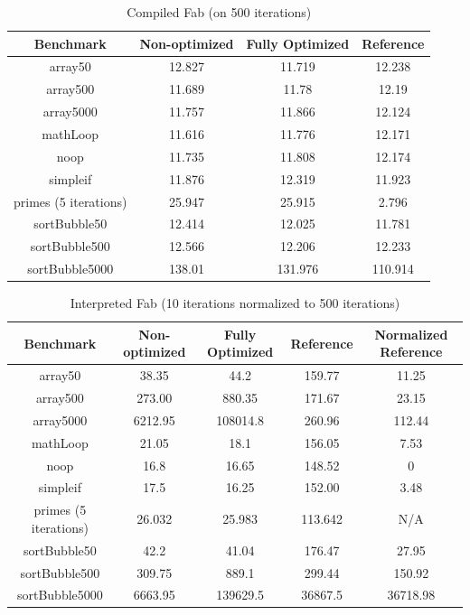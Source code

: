 \documentclass[11pt]{article} %
\begin{document}
\begin{table}[h!]
\centering
\caption{Compiled Fab (on 500 iterations)}
\begin{tabular}{c | c | c | c }
Benchmark & Non-optimized & Fully Optimized & Reference\\ \hline
array50 & 12.827 & 11.719 & 12.238\\ \hline
array500 & 11.689 & 11.78 & 12.19\\ \hline
array5000 & 11.757 & 11.866 & 12.124\\ \hline
mathLoop & 11.616 & 11.776 & 12.171\\ \hline
noop & 11.735 & 11.808 & 12.174\\ \hline
simpleif & 11.876 & 12.319 & 11.923\\ \hline
primes (5 iterations) & 25.947 & 25.915 & 2.796\\ \hline
sortBubble50 & 12.414 & 12.025 & 11.781\\ \hline
sortBubble500 & 12.566 & 12.206 & 12.233\\ \hline
sortBubble5000 & 138.01 & 131.976 & 110.914\\ \hline
\end{tabular}
\end{table}

\begin{table}[h!]
\centering
\caption{Interpreted Fab (10 iterations normalized to 500 iterations)}
\begin{tabular}{c | c | c | c | c}
Benchmark & Non-optimized & Fully Optimized & Reference & Normalized Reference\\ \hline
array50 & 38.35 & 44.2 & 159.77 & 11.25\\ \hline
array500 & 273.00 & 880.35 & 171.67 & 23.15\\ \hline
array5000 & 6212.95 & 108014.8 & 260.96 & 112.44\\ \hline
mathLoop & 21.05 & 18.1 & 156.05 & 7.53\\ \hline
noop & 16.8 & 16.65 & 148.52 & 0\\ \hline
simpleif & 17.5 & 16.25 & 152.00 & 3.48\\ \hline
primes (5 iterations) & 26.032 & 25.983 & 113.642 & N/A\\ \hline
sortBubble50 & 42.2 & 41.04 & 176.47 & 27.95\\ \hline
sortBubble500 & 309.75 & 889.1 & 299.44 & 150.92\\ \hline
sortBubble5000 & 6663.95 & 139629.5 & 36867.5 & 36718.98\\ \hline
\end{tabular}
\end{table}
\end{document}
